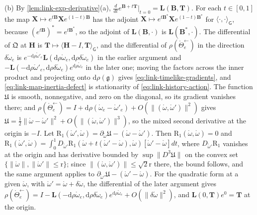 (b) By \cref{lem:link-exp-derivative}(a),
$\tfrac d{dt}e^{\mathbf B+t\mathbf T}\vert_{t=0}=\mathbf L(\mathbf B,\mathbf T)$. For each $t\in[0,1]$
the map $\mathbf X\mapsto e^{t\mathbf B}\mathbf Xe^{(1-t)\mathbf B}$ has the adjoint
$\mathbf X\mapsto e^{t\mathbf B^*}\mathbf Xe^{(1-t)\mathbf B^*}$ for $\langle\cdot,\cdot\rangle_{\mathsf G}$,
because $(e^{t\mathbf B})^*=e^{t\mathbf B^*}$, so the adjoint of $\mathbf L(\mathbf B,\cdot)$ is
$\mathbf L(\mathbf B^*,\cdot)$. The differential of $\mathfrak Q$ at $\mathbf H$ is
$\mathbf T\mapsto\langle\mathbf H-I,\mathbf T\rangle_{\mathsf G}$, and the differential of
$\rho(\mathring\Theta^{\leftarrow}_e)$ in the direction $\delta\mathring\omega_e$ is
$e^{-\mathrm d\rho\mathring\omega'_e}\mathbf L(\mathrm d\rho\mathring\omega_e,\mathrm d\rho\delta\mathring\omega_e)$ in the
earlier argument and
$-\mathbf L(-\mathrm d\rho\mathring\omega'_e,\mathrm d\rho\delta\mathring\omega_e)e^{\mathrm d\rho\mathring\omega_e}$ in the
later one; moving the factors across the inner product and projecting onto $\mathrm d\rho(\mathfrak g)$
gives \eqref{eq:link-timelike-gradients}, and \eqref{eq:link-map-inertia-defect} is stationarity of
\eqref{eq:link-history-action}. The function $\mathfrak U$ is smooth, nonnegative, and zero on the
diagonal, so its gradient vanishes there; and
$\rho(\mathring\Theta^{\leftarrow}_e)=I+\mathrm d\rho(\mathring\omega_e-\mathring\omega'_e)+O(\lVert(\mathring\omega,\mathring\omega')\rVert^2)$
gives $\mathfrak U=\tfrac12\lVert\mathring\omega-\mathring\omega'\rVert^2+O(\lVert(\mathring\omega,\mathring\omega')\rVert^3)$,
so the mixed second derivative at the origin is $-I$. Let
$\mathrm R_1(\mathring\omega',\mathring\omega)=\partial_{\mathring\omega}\mathfrak U-(\mathring\omega-\mathring\omega')$.
Then $\mathrm R_1(\mathring\omega,\mathring\omega)=0$ and
$\mathrm R_1(\mathring\omega',\mathring\omega)=\int_0^1D_{\mathring\omega'}\mathrm R_1(\mathring\omega+t(\mathring\omega'-\mathring\omega),\mathring\omega)[\mathring\omega'-\mathring\omega]dt$,
where $D_{\mathring\omega'}\mathrm R_1$ vanishes at the origin and has derivative bounded by
$\sup\lVert D^3\mathfrak U\rVert$ on the convex set
$\{\lVert\mathring\omega\rVert,\lVert\mathring\omega'\rVert\leq\mathrm r\}$; since
$\lVert(\mathring\omega,\mathring\omega')\rVert\leq\sqrt2\mathrm r$ there, the bound follows, and the same
argument applies to $\partial_{\mathring\omega'}\mathfrak U-(\mathring\omega'-\mathring\omega)$. For the
quadratic form at a given $\mathring\omega$, with $\mathring\omega'=\mathring\omega+\delta\mathring\omega$,
the differential of the later argument gives
$\rho(\mathring\Theta^{\leftarrow}_e)=I-\mathbf L(-\mathrm d\rho\mathring\omega_e,\mathrm d\rho\delta\mathring\omega_e)e^{\mathrm d\rho\mathring\omega_e}+O(\lVert\delta\mathring\omega\rVert^2)$,
and $\mathbf L(0,\mathbf T)e^{0}=\mathbf T$ at the origin.

